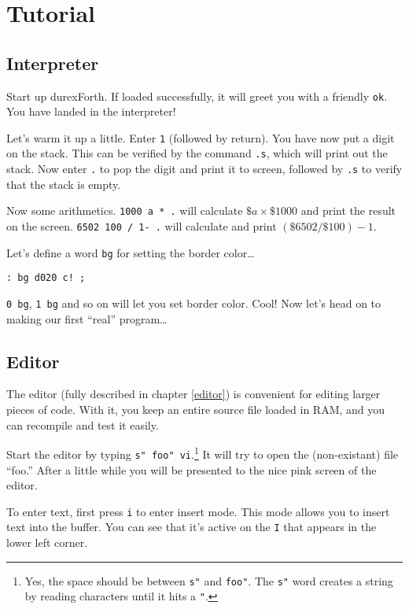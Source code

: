 \chapter{Tutorial}

\section{Interpreter}

Start up durexForth. If loaded successfully, it will greet you with a friendly \texttt{ok}. You have landed in the interpreter!

Let's warm it up a little. Enter \texttt{1} (followed by return). You have now put a digit on the stack. This can be verified by the command \texttt{.s}, which will print out the stack. Now enter \texttt{.} to pop the digit and print it to screen, followed by \texttt{.s} to verify that the stack is empty.

Now some arithmetics. \texttt{1000 a * .} will calculate $\$a \times \$1000$ and print the result on the screen. \texttt{6502 100 / 1- .} will calculate and print $(\$6502 / \$100) - 1$.

Let's define a word \texttt{bg} for setting the border color\ldots 

\begin{verbatim}
: bg d020 c! ;
\end{verbatim}

\texttt{0 bg}, \texttt{1 bg} and so on will let you set border color. Cool! Now let's head on to making our first ``real'' program\ldots

\section{Editor}

The editor (fully described in chapter \ref{editor}) is convenient for editing larger pieces of code. With it, you keep an entire source file loaded in RAM, and you can recompile and test it easily.

Start the editor by typing \texttt{s" foo" vi}.\footnote{Yes, the space should be between \texttt{s"} and \texttt{foo"}. The \texttt{s"} word creates a string by reading characters until it hits a \texttt{"}.}
It will try to open the (non-existant) file ``foo.'' After a little while you will be presented to the nice pink screen of the editor. 

To enter text, first press \texttt{i} to enter insert mode. This mode allows you to insert text into the buffer. You can see that it's active on the \texttt{I} that appears in the lower left corner.

